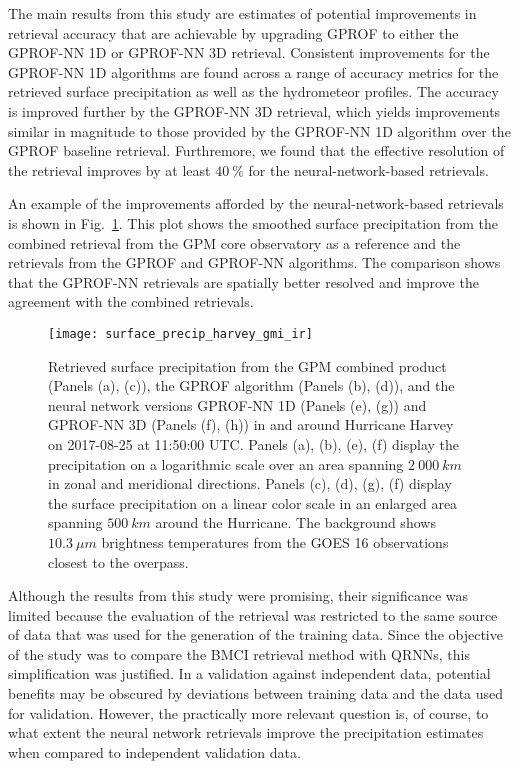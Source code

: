 The main results from this study are estimates of potential improvements in
retrieval accuracy that are achievable by upgrading GPROF to either the GPROF-NN
1D or GPROF-NN 3D retrieval. Consistent improvements for the GPROF-NN 1D
algorithms are found across a range of accuracy metrics for the retrieved
surface precipitation as well as the hydrometeor profiles. The accuracy is
improved further by the GPROF-NN 3D retrieval, which yields improvements similar
in magnitude to those provided by the GPROF-NN 1D algorithm over the GPROF
baseline retrieval. Furthremore, we found that the effective resolution of the
retrieval improves by at least $\SI{40}{\percent}$ for the neural-network-based
retrievals.

An example of the improvements afforded by the neural-network-based retrievals
is shown in Fig.~\ref{fig:machine_learning:hurricane_harvey}. This plot shows
the smoothed surface precipitation from the combined retrieval from the GPM core
observatory as a reference and the retrievals from the GPROF and GPROF-NN
algorithms. The comparison shows that the GPROF-NN retrievals are spatially
better resolved and improve the agreement with the combined retrievals.

\begin{figure}
  \centering
  \texttt{[image: surface\_precip\_harvey\_gmi\_ir]}
  \caption{ Retrieved surface precipitation from the GPM combined product
    (Panels (a), (c)), the GPROF algorithm (Panels (b), (d)), and the neural
    network versions GPROF-NN 1D (Panels (e), (g)) and GPROF-NN 3D (Panels (f),
    (h)) in and around Hurricane Harvey on 2017-08-25 at 11:50:00 UTC. Panels
    (a), (b), (e), (f) display the precipitation on a logarithmic scale over an
    area spanning $2\ 000\ \unit{km}$ in zonal and meridional directions.
    Panels (c), (d), (g), (f) display the surface precipitation on a linear
    color scale in an enlarged area spanning $500\ \unit{km}$ around the
    Hurricane. The background shows $10.3\ \unit{\mu m}$ brightness temperatures
    from the GOES 16 observations closest to the overpass.
  }
  \label{fig:machine_learning:hurricane_harvey}
\end{figure}

Although the results from this study were promising, their significance was
limited because the evaluation of the retrieval was restricted to the same
source of data that was used for the generation of the training data. Since the
objective of the study was to compare the BMCI retrieval method with QRNNs, this
simplification was justified. In a validation against independent data,
potential benefits may be obscured by deviations between training data and the
data used for validation. However, the practically more relevant question is, of
course, to what extent the neural network retrievals improve the precipitation
estimates when compared to independent validation data.

